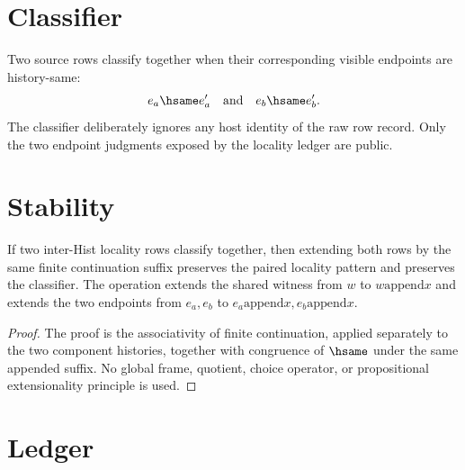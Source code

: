 \section{Classifier}
\label{sec:concrete-instances-inter-hist-locality-classifier}

\begin{definition}
\label{def:concrete-instances-inter-hist-locality-classifier}
Two source rows classify together when their corresponding visible endpoints
are history-same:
$$
\begin{aligned}
  e_a \hsame e'_a \quad\text{and}\quad e_b \hsame e'_b.
\end{aligned}
$$
The classifier deliberately ignores any host identity of the raw row record.
Only the two endpoint judgments exposed by the locality ledger are public.
\end{definition}

\section{Stability}
\label{sec:concrete-instances-inter-hist-locality-stability}

\begin{theorem}
\label{thm:concrete-instances-inter-hist-locality-stability}
If two inter-Hist locality rows classify together, then extending both rows by
the same finite continuation suffix preserves the paired locality pattern and
preserves the classifier.  The operation extends the shared witness from $w$ to
$w \mathbin{\mathrm{append}} x$ and extends the two endpoints from $e_a,e_b$ to
$e_a \mathbin{\mathrm{append}} x,e_b \mathbin{\mathrm{append}} x$.
\end{theorem}

\begin{proof}
The proof is the associativity of finite continuation, applied separately to
the two component histories, together with congruence of $\hsame$ under the
same appended suffix.  No global frame, quotient, choice operator, or
propositional extensionality principle is used.
\end{proof}

\section{Ledger}
\label{sec:concrete-instances-inter-hist-locality-ledger}

